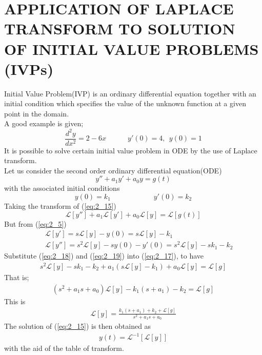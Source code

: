 \documentclass[11pt]{report}
\newcommand{\Laplace}{\mathcal{L}}
\newcommand{\sbracket}[1]{\left[#1\right]}
\newcommand{\LFn}[1]{\Laplace \sbracket{#1}}
\newcommand{\InverseL}[1]{\Laplace^{-1}\left[#1\right]}
\newcommand{\sps}{\\[0.2cm]}
\newcommand{\refn}[1]{(\ref{#1})}
\newcommand{\refx}[1]{\refn{eq:#1}}
\newcommand{\sprime}{'}
\newcommand{\dprime}{''}
\begin{document}
	\section{APPLICATION OF LAPLACE TRANSFORM TO SOLUTION OF INITIAL VALUE PROBLEMS (IVPs)}
	Initial Value Problem(IVP) is an ordinary differential equation together with an initial condition which specifies the value of the unknown function at a given point in the domain.\\A good example is given;
	\begin{equation*}
		\frac{d^2y}{dx^2}=2-6x \qquad\quad y\sprime(0)=4, ~~ y(0)=1
	\end{equation*}
	It is possible to solve certain initial value problem in ODE by the use of Laplace transform.\\
	Let us consider the second order ordinary differential equation(ODE)
	\begin{equation}
		y\dprime + a_1 y\sprime + a_0y = g(t)
		\label{eq:2_15}
	\end{equation}
	with the associated initial conditions
	\begin{equation}
		y(0)=k_1\qquad\qquad\qquad y\sprime(0)=k_2
		\label{eq:2_16}
	\end{equation}
	Taking the transform of \refx{2_15}
	\begin{equation}
		\LFn{y\dprime} + a_1\LFn{y\sprime} + a_0\LFn{y} = \LFn{g(t)}
		\label{eq:2_17}
	\end{equation}
	But from \refx{2_5}
	\begin{eqnarray}
		&&\LFn{y\sprime}=s\LFn{y} - y(0) = s\LFn{y} - k_1\label{eq:2_18}\sps
		&& \LFn{y\dprime} = s^2\LFn{y}-sy(0)-y\sprime(0)=s^2\LFn{y}-sk_1 - k_2\label{eq:2_19}
	\end{eqnarray}
	Substitute \refx{2_18} and \refx{2_19} into \refx{2_17}, to have
	\begin{eqnarray*}
		s^2\LFn{y}-sk_1 - k_2 + a_1(s\LFn{y} - k_1)+ a_0\LFn{y} = \LFn{g}
	\end{eqnarray*}
	That is;
	\begin{eqnarray}
		(s^2+a_1s+a_0)\LFn{y} - k_1(s+a_1)-k_2 = \LFn{g}\label{eq:2_20}
	\end{eqnarray}
	This is
	\begin{eqnarray}
		\LFn{y} = \frac{k_1(s+a_1)+k_2+\LFn{g}}{s^2 +a_1s+a_0}\label{eq:2_21}
	\end{eqnarray}
	The solution of \refx{2_15} is then obtained as
	\begin{eqnarray}
		y(t) = \InverseL{\LFn{y}}\label{eq:2_22}
	\end{eqnarray}
	with the aid of the table of transform.\sps
	
\end{document}
